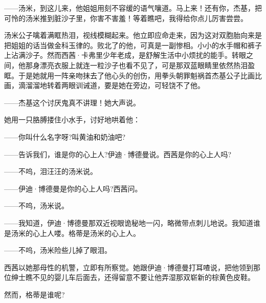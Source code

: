 \par ——汤米，到这儿来，他姐姐用刻不容缓的语气嚷道。马上来！还有你，杰基，把可怜的汤米推到脏沙子里，你害不害羞！等着瞧吧，我得给你点儿厉害尝尝。
\par 汤米公子噙着满眶热泪，视线模糊起来。他立即应命走来，因为这对双胞胎向来是把姐姐的话当做金科玉律的。败北了的他，可真是一副惨相。小小的水手帽和裤子上沾满沙子。然而西茜·卡弗里少年老成，是舒解生活中小烦扰的能手。转眼之间，他那身漂亮衣服上就连一粒沙子也看不见了，可是那双蓝眼睛里依然热泪盈眶。于是她就用一阵亲吻抹去了他心头的创伤，用拳头朝罪魁祸首杰基公子比画比画，滴溜溜地转着两眼训诫道，要是她在旁边，可轻饶不了他。
\par ——杰基这个讨厌鬼真不讲理！她大声说。
\par 她用一只胳膊搂住小水手，讨好地哄着他：
\par ——你叫什么名字呀?叫黄油和奶油吧?
\par ——告诉我们，谁是你的心上人?伊迪·博德曼说。西茜是你的心上人吗?
\par ——不呜，泪汪汪的汤米说。
\par ——伊迪·博德曼是你的心上人吗?西茜问。
\par ——不呜，汤米说。
\par ——我知道，伊迪·博德曼那双近视眼诡秘地一闪，略微带点刺儿地说。我知道谁是汤米的心上人喽。格蒂是汤米的心上人。
\par ——不呜，汤米险些儿掉了眼泪。
\par 西茜以她那母性的机警，立即有所察觉。她跟伊迪·博德曼打耳喳说，把他领到那位绅士瞧不见的婴儿车后面去，还得留意不要让他弄湿那双崭新的棕黄色皮鞋。
\par 然而，格蒂是谁呢?
